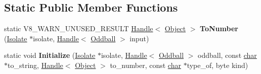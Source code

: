 \subsection*{Static Public Member Functions}
\begin{DoxyCompactItemize}
\item 
\mbox{\label{classv8_1_1internal_1_1Oddball_a1a5d9c9c0e298850bc20379ff80a5602}} 
static V8\+\_\+\+W\+A\+R\+N\+\_\+\+U\+N\+U\+S\+E\+D\+\_\+\+R\+E\+S\+U\+LT \mbox{\hyperlink{classv8_1_1internal_1_1Handle}{Handle}}$<$ \mbox{\hyperlink{classv8_1_1internal_1_1Object}{Object}} $>$ {\bfseries To\+Number} (\mbox{\hyperlink{classv8_1_1internal_1_1Isolate}{Isolate}} $\ast$isolate, \mbox{\hyperlink{classv8_1_1internal_1_1Handle}{Handle}}$<$ \mbox{\hyperlink{classv8_1_1internal_1_1Oddball}{Oddball}} $>$ input)
\item 
\mbox{\label{classv8_1_1internal_1_1Oddball_a526ba73cfd30a120b8b7bb95b3269f10}} 
static void {\bfseries Initialize} (\mbox{\hyperlink{classv8_1_1internal_1_1Isolate}{Isolate}} $\ast$isolate, \mbox{\hyperlink{classv8_1_1internal_1_1Handle}{Handle}}$<$ \mbox{\hyperlink{classv8_1_1internal_1_1Oddball}{Oddball}} $>$ oddball, const \mbox{\hyperlink{classchar}{char}} $\ast$to\+\_\+string, \mbox{\hyperlink{classv8_1_1internal_1_1Handle}{Handle}}$<$ \mbox{\hyperlink{classv8_1_1internal_1_1Object}{Object}} $>$ to\+\_\+number, const \mbox{\hyperlink{classchar}{char}} $\ast$type\+\_\+of, byte kind)
\end{DoxyCompactItemize}
